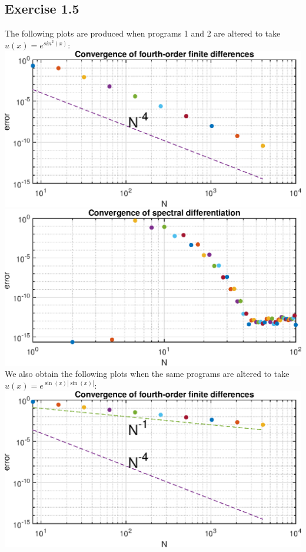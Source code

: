 \documentclass{article}
\begin{document}
\subsection{Exercise 1.5}
The following plots are produced when programs 1 and 2 are altered to take $u(x)=e^{sin^2(x)}$:\\
\includegraphics[]{p1a.eps}
\includegraphics[]{p2a.eps}\\
We also obtain the following plots when the same programs are altered to take $u(x)=e^{\sin(x)|\sin(x)|}$:\\
\includegraphics[]{p1b.eps}
\end{document}

